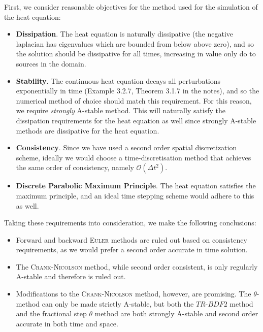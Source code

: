 \vspace{0.5cm}
\begin{solution}

First, we consider reasonable objectives for the method used for the simulation of the heat equation:
\begin{itemize}
\item \textbf{Dissipation}. The heat equation is naturally dissipative (the negative laplacian has eigenvalues which are bounded from below above zero), and so the solution should be dissipative for all times, increasing in value only do to sources in the domain.
\item \textbf{Stability}. The continuous heat equation decays all perturbations exponentially in time (Example 3.2.7, Theorem 3.1.7 in the notes), and so the numerical method of choice should match this requirement. For this reason, we require \textit{strongly} A-stable method. This will naturally satisfy the dissipation requirements for the heat equation as well since strongly A-stable methods are dissipative for the heat equation.
\item \textbf{Consistency}. Since we have used a second order spatial discretization scheme, ideally we would choose a time-discretisation method that achieves the same order of consistency, namely $\mathcal{O}(\Delta t^2)$.
\item \textbf{Discrete Parabolic Maximum Principle}. The heat equation satisfies the maximum principle, and an ideal time stepping scheme would adhere to this as well.
\end{itemize}

Taking these requirements into consideration, we make the following conclusions:
\begin{itemize}
\item Forward and backward \textsc{Euler} methods are ruled out based on consistency requirements, as we would prefer a second order accurate in time solution.
\item The \textsc{Crank-Nicolson} method, while second order consistent, is only regularly A-stable and therefore is ruled out.
\item Modifications to the \textsc{Crank-Nicolson} method, however, are promising. The $\theta$-method can only be made strictly A-stable, but both the $TR\text{-}BDF2$ method and the fractional step $\theta$ method are both strongly A-stable and second order accurate in both time and space.
\end{itemize}


\end{solution}
